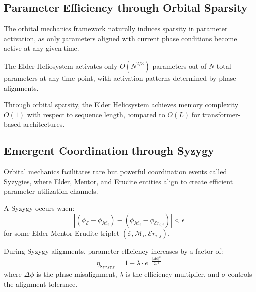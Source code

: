 \subsection{Parameter Efficiency through Orbital Sparsity}

The orbital mechanics framework naturally induces sparsity in parameter activation, as only parameters aligned with current phase conditions become active at any given time.

\begin{proposition}
The Elder Heliosystem activates only $O(N^{2/3})$ parameters out of $N$ total parameters at any time point, with activation patterns determined by phase alignments.
\end{proposition}

\begin{corollary}
Through orbital sparsity, the Elder Heliosystem achieves memory complexity $O(1)$ with respect to sequence length, compared to $O(L)$ for transformer-based architectures.
\end{corollary}

\subsection{Emergent Coordination through Syzygy}

Orbital mechanics facilitates rare but powerful coordination events called Syzygies, where Elder, Mentor, and Erudite entities align to create efficient parameter utilization channels.

\begin{definition}
A Syzygy occurs when:
\begin{equation}
|(\phi_{\mathcal{E}} - \phi_{\mathcal{M}_i}) - (\phi_{\mathcal{M}_i} - \phi_{\mathcal{E}r_{i,j}})| < \epsilon
\end{equation}
for some Elder-Mentor-Erudite triplet $(\mathcal{E}, \mathcal{M}_i, \mathcal{E}r_{i,j})$.
\end{definition}

\begin{theorem}
During Syzygy alignments, parameter efficiency increases by a factor of:
\begin{equation}
\eta_{\text{Syzygy}} = 1 + \lambda \cdot e^{-\frac{|\Delta\phi|^2}{2\sigma^2}}
\end{equation}
where $\Delta\phi$ is the phase misalignment, $\lambda$ is the efficiency multiplier, and $\sigma$ controls the alignment tolerance.
\end{theorem}

